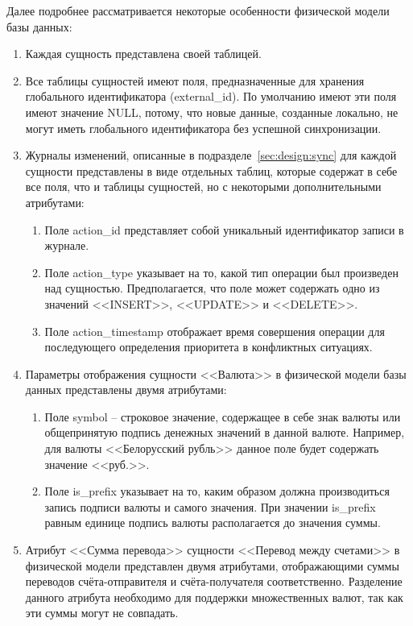 Далее подробнее рассматривается некоторые особенности физической модели базы данных:
\begin{enumerate}
    \item Каждая сущность представлена своей таблицей.
    \item Все таблицы сущностей имеют поля, предназначенные для хранения глобального идентификатора (external\_id).
    По умолчанию имеют эти поля имеют значение NULL, потому, что новые данные, созданные локально, не могут иметь глобального идентификатора без успешной синхронизации.
    \item Журналы изменений, описанные в подразделе~\ref{sec:design:sync} для каждой сущности представлены в виде отдельных таблиц, которые содержат в себе все поля, что и таблицы сущностей, но с некоторыми дополнительными атрибутами:
    \begin{enumerate}
        \item Поле action\_id представляет собой уникальный идентификатор записи в журнале.
        \item Поле action\_type указывает на то, какой тип операции был произведен над сущностью.
        Предполагается, что поле может содержать одно из значений <<INSERT>>, <<UPDATE>> и <<DELETE>>.
        \item Поле action\_timestamp отображает время совершения операции для последующего определения приоритета в конфликтных ситуациях.
    \end{enumerate}
    \item Параметры отображения сущности <<Валюта>> в физической модели базы данных представлены двумя атрибутами:
    \begin{enumerate}
        \item Поле symbol -- строковое значение, содержащее в себе знак валюты или общепринятую подпись денежных значений в данной валюте.
        Например, для валюты <<Белорусский рубль>> данное поле будет содержать значение <<руб.>>.
        \item Поле is\_prefix указывает на то, каким образом должна производиться запись подписи валюты и самого значения.
        При значении is\_prefix равным единице подпись валюты располагается до значения суммы.
    \end{enumerate}
    \item Атрибут <<Сумма перевода>> сущности <<Перевод между счетами>> в физической модели представлен двумя атрибутами, отображающими суммы переводов счёта-отправителя и счёта-получателя соответственно.
    Разделение данного атрибута необходимо для поддержки множественных валют, так как эти суммы могут не совпадать.
\end{enumerate}

